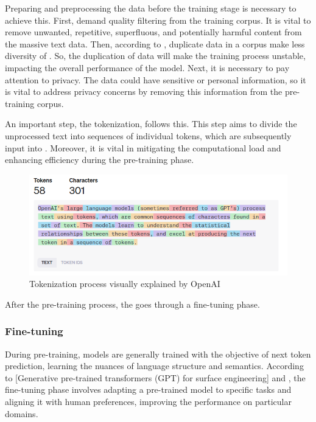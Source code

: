 Preparing and preprocessing the data before the training stage is necessary to achieve this. First, demand quality filtering from the training corpus. It is vital to remove unwanted, repetitive, superfluous, and potentially harmful content from the massive text data. Then, according to \citet{hadi_LLM_2023}, duplicate data in a corpus make less diversity of {\llm}. So, the duplication of data will make the training process unstable, impacting the overall performance of the model. Next, it is necessary to pay attention to privacy. The data could have sensitive or personal information, so it is vital to address privacy concerns by removing this information from the pre-training corpus.

An important step, the tokenization, follows this. This step aims to divide the unprocessed text into sequences of individual tokens, which are subsequently input into {\llm}. Moreover, it is vital in mitigating the computational load and enhancing efficiency during the pre-training phase.

\begin{figure}[ht]
    \includegraphics[width=14cm]{figs/chapter2/tokenization.png}
    \centering
    \caption{Tokenization process visually explained by OpenAI \cite{noauthor_openai_nodate}}
\end{figure}

After the pre-training process, the {\llm} goes through a fine-tuning phase.


\subsubsection{Fine-tuning}

\citet{hadi_LLM_2023}

During pre-training, models are generally trained with the objective of next token prediction, learning the nuances of language structure and semantics. According to [Generative pre-trained transformers (GPT) for surface engineering] and \citet{hadi_LLM_2023}, the fine-tuning phase involves adapting a pre-trained model to specific tasks and aligning it with human preferences, improving the performance on particular domains.

